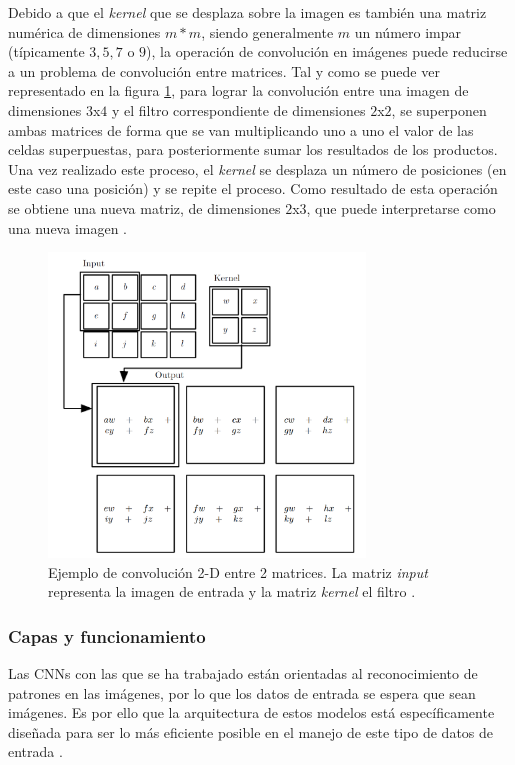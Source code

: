Debido a que el \textit{kernel} que se desplaza sobre la imagen es también una matriz numérica de dimensiones $m*m$, siendo generalmente $m$ un número impar (típicamente $3, 5, 7$ o $9$), la operación de convolución en imágenes puede reducirse a un problema de convolución entre matrices. Tal y como se puede ver representado en la figura \ref{fig:convolucion}, para lograr la convolución entre una imagen de dimensiones $3$x$4$ y el filtro correspondiente de dimensiones $2$x$2$, se superponen ambas matrices de forma que se van multiplicando uno a uno el valor de las celdas superpuestas, para posteriormente sumar los resultados de los productos. Una vez realizado este proceso, el \textit{kernel} se desplaza un número de posiciones (en este caso una posición) y se repite el proceso. Como resultado de esta operación se obtiene una nueva matriz, de dimensiones  $2$x$3$, que puede interpretarse como una nueva imagen \cite{cnn:biblia_deeplearning}.

\begin{figure}[h]
    \centering
    \includegraphics[width=0.75\textwidth]{img/convolucion.png}
    \caption{Ejemplo de convolución 2-D entre 2 matrices. La matriz \textit{input} representa la imagen de entrada y la matriz \textit{kernel} el filtro \cite{cnn:biblia_deeplearning}.}
    \label{fig:convolucion}
\end{figure}

\subsubsection{Capas y funcionamiento}

Las CNNs con las que se ha trabajado están orientadas al reconocimiento de patrones en las imágenes, por lo que los datos de entrada se espera que sean imágenes. Es por ello que la arquitectura de estos modelos está específicamente diseñada para ser lo más eficiente posible en el manejo de este tipo de datos de entrada \cite{cnn:osea}. 


